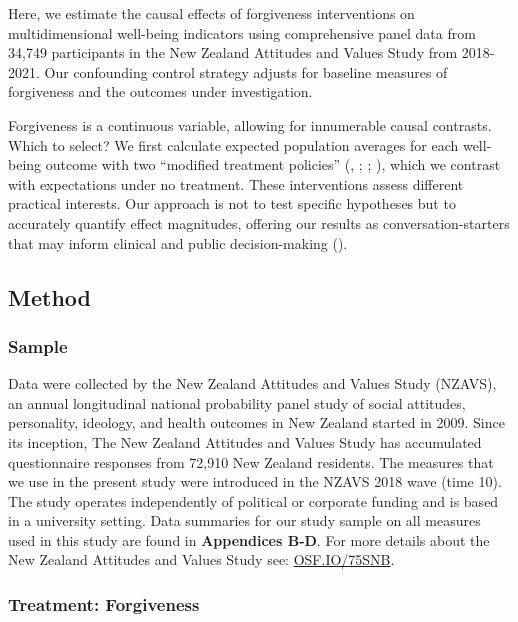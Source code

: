 \documentclass[
  single column]{article}
\begin{document}
Here, we estimate the causal effects of forgiveness interventions on
multidimensional well-being indicators using comprehensive panel data
from 34,749 participants in the New Zealand Attitudes and Values Study
from 2018-2021. Our confounding control strategy adjusts for baseline
measures of forgiveness and the outcomes under investigation.

Forgiveness is a continuous variable, allowing for innumerable causal
contrasts. Which to select? We first calculate expected population
averages for each well-being outcome with two ``modified treatment
policies'' (,
;
;
), which we
contrast with expectations under no treatment. These interventions
assess different practical interests. Our approach is not to test
specific hypotheses but to accurately quantify effect magnitudes,
offering our results as conversation-starters that may inform clinical
and public decision-making ().

\subsection{Method}\label{method}

\subsubsection{Sample}\label{sample}

Data were collected by the New Zealand Attitudes and Values Study
(NZAVS), an annual longitudinal national probability panel study of
social attitudes, personality, ideology, and health outcomes in New
Zealand started in 2009. Since its inception, The New Zealand Attitudes
and Values Study has accumulated questionnaire responses from 72,910 New
Zealand residents. The measures that we use in the present study were
introduced in the NZAVS 2018 wave (time 10). The study operates
independently of political or corporate funding and is based in a
university setting. Data summaries for our study sample on all measures
used in this study are found in \textbf{Appendices B-D}. For more
details about the New Zealand Attitudes and Values Study see:
\href{https://doi.org/10.17605/OSF.IO/75SNB}{OSF.IO/75SNB}.

\subsubsection{Treatment: Forgiveness}\label{treatment-forgiveness}
\end{document}
